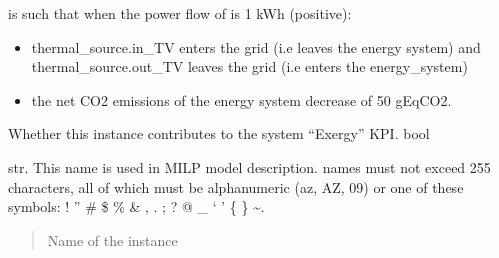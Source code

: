 \documentclass[letterpaper,10pt,english]{sphinxmanual}
\begin{document}
\begin{fulllineitems}
\begin{fulllineitems}
\sphinxAtStartPar
{} is such that when the power flow of  is 1 kWh (positive):
\begin{itemize}
\item {} 
\sphinxAtStartPar
thermal\_source.in\_TV enters the grid (i.e leaves the energy system)
and thermal\_source.out\_TV leaves the grid (i.e enters the energy\_system)

\item {} 
\sphinxAtStartPar
the net CO2 emissions of the energy system decrease of 50 gEqCO2.

\end{itemize}

\end{fulllineitems}


\begin{fulllineitems}
\label{\detokenize{generated/tamos.elementIO.Grid:tamos.elementIO.Grid.exergy_count}}
\pysigstartsignatures
{}
\pysigstopsignatures
\sphinxAtStartPar
Whether this instance contributes to the system “Exergy” KPI.
bool

\end{fulllineitems}


\begin{fulllineitems}
\label{\detokenize{generated/tamos.elementIO.Grid:tamos.elementIO.Grid.name}}
\pysigstartsignatures
{}
\pysigstopsignatures
\sphinxAtStartPar
str.
This name is used in MILP model description.
names must not exceed 255 characters,
all of which must be alphanumeric (a\sphinxhyphen{}z, A\sphinxhyphen{}Z, 0\sphinxhyphen{}9) or one of these symbols:
! ” \# \$ \% \& , . ; ? @ \_ ‘ ’ \{ \} \textasciitilde{}.
\begin{quote}\begin{description}
\sphinxAtStartPar
Name of the instance

\end{description}\end{quote}


\end{fulllineitems}
\end{fulllineitems}
\end{document}
